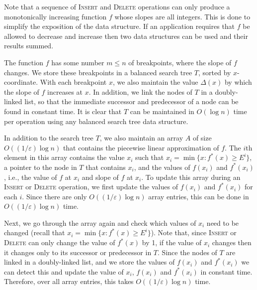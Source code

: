 \documentclass[charterfonts,lotsofwhite]{patmorin}
\newcommand{\eps}{\varepsilon}
\begin{document}
Note that a sequence of \textsc{Insert} and \textsc{Delete} operations
can only produce a monotonically increasing function $f$ whose slopes
are all integers.  This is done to simplify the exposition of the data
structure.  If an application requires that $f$ be allowed to decrease
and increase then two data structures can be used and their results
summed.  

The function $f$ has some number $m\le n$ of breakpoints, where the slope
of $f$ changes.  We store these breakpoints in a balanced search tree
$T$, sorted by $x$-coordinate.  With each breakpoint $x$, we also
maintain the value $\Delta(x)$ by which the slope of $f$ increases at
$x$.  In addition, we link the nodes of $T$ in a doubly-linked list,
so that the immediate successor and predecessor of a node can be found
in constant time.  It is clear that $T$ can be maintained in $O(\log
n)$ time per operation using any balanced search tree data structure.

In addition to the search tree $T$, we also maintain an array $A$ of
size $O((1/\eps) \log n)$ that contains the piecewise linear
approximation of $f$.  The $i$th element in this array contains the
value $x_i$ such that $x_i=\min\{x:f^*(x) \ge E^i \}$, a pointer to
the node in $T$ that contains $x_i$, and the values of $f(x_i)$ and
$f^*(x_i)$, i.e., the value of $f$ at $x_i$ and slope of $f$ at $x_i$.
To update this array during an \textsc{Insert} or \textsc{Delete}
operation, we first update the values of $f(x_i)$ and $f^*(x_i)$ for
each $i$.  Since there are only $O((1/\eps) \log n)$ array entries,
this can be done in $O((1/\eps) \log n)$ time.

Next, we go through the array again and check which values of $x_i$
need to be changed (recall that $x_i=\min\{x:f^*(x) \ge E^i \}$).
Note that, since \textsc{Insert} or \textsc{Delete} can only change
the value of $f^*(x)$ by 1, if the value of $x_i$ changes then it
changes only to its successor or predecessor in $T$.  Since the nodes
of $T$ are linked in a doubly-linked list, and we store the values of
$f(x_i)$ and $f^*(x_i)$ we can detect this and update the value of
$x_i$, $f(x_i)$ and $f^*(x_i)$ in constant time.  Therefore, over all
array entries, this takes $O((1/\eps) \log n)$ time.
\end{document}
